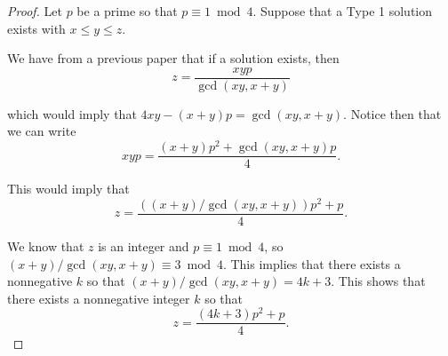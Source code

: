 \documentclass[10pt,a4paper]{amsart}
\begin{document}
\begin{proof}
Let $p$  be a prime so that $p \equiv 1 \bmod 4$.  Suppose that a Type 1 solution exists with $x \leq y \leq z$.

We have from a previous paper that if a solution exists, then $$z =  \frac{xyp}{\gcd(xy,x+y)}$$

\noindent which would imply that $4xy - (x+y)p = \gcd(xy,x+y)$.  Notice then that we can write $$xyp = \frac{(x+y)p^{2} + \gcd(xy, x+y)p}{4}.$$

This would imply that $$ z=\frac{\left( (x+y) \slash \gcd(xy,x+y) \right)p^{2}+p}{4}. $$

We know that $z$  is an integer and $p \equiv 1 \bmod 4$, so $(x+y) \slash \gcd(xy,x+y) \equiv 3 \bmod 4$.    This implies that there exists a nonnegative $k$  so that $(x+y) \slash \gcd(xy,x+y) = 4k+3$.  This shows that there exists a nonnegative integer $k$  so that $$  z= \frac{(4k+3)p^{2}+p}{4}.$$
\end{proof}
\end{document}
